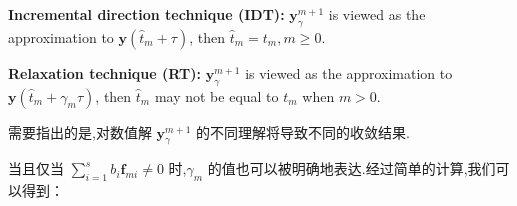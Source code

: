 	\textbf{Incremental direction technique (IDT):} $\bm{y}_\gamma^{m+1}$ is viewed as the approximation to $\bm{y}\left(\hat{t}_m+\tau\right)$, then $\hat{t}_m=t_m, m \geq 0$.

	\textbf{Relaxation technique (RT):} $ \bm{y}_\gamma^{m+1}$ is viewed as the approximation to $\bm{y}\left(\hat{t}_m+\right.\left.\gamma_m \tau\right)$, then $\hat{t}_m$ may not be equal to $t_m$ when $m>0$.

需要指出的是,对数值解 $\bm{y}_\gamma^{m+1}$ 的不同理解将导致不同的收敛结果.

当且仅当 $\sum\limits_{i=1}^s b_i \bm{f}_{m i}\neq 0$ 时,$\gamma_m$ 的值也可以被明确地表达.经过简单的计算,我们可以得到：

